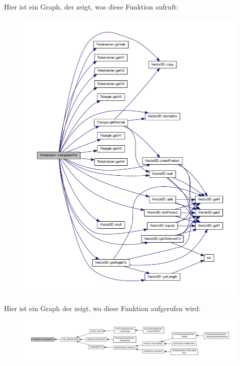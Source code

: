 Hier ist ein Graph, der zeigt, was diese Funktion aufruft\-:
\nopagebreak
\begin{figure}[H]
\begin{center}
\leavevmode
\includegraphics[width=350pt]{classInterpolator_a30e714ca6dff9b5745d029f95af1420a_cgraph}
\end{center}
\end{figure}




Hier ist ein Graph der zeigt, wo diese Funktion aufgerufen wird\-:
\nopagebreak
\begin{figure}[H]
\begin{center}
\leavevmode
\includegraphics[width=350pt]{classInterpolator_a30e714ca6dff9b5745d029f95af1420a_icgraph}
\end{center}
\end{figure}


